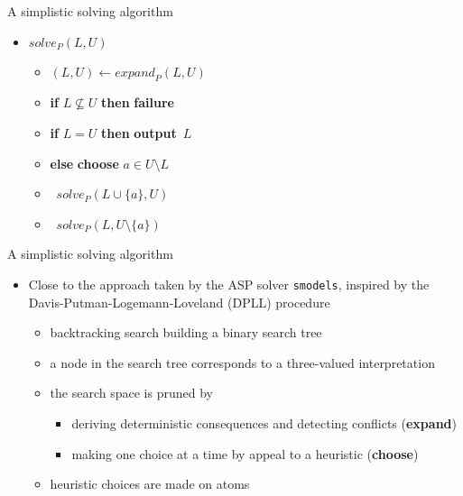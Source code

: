 \begin{frame}{A simplistic solving algorithm}
  \bigskip
  \begin{itemize}
  \item [] $\mathit{solve}_P(L,U)$
    \smallskip
    \begin{itemize}\normalsize
    \item [] $(L,U)\leftarrow\mathit{expand}_P(L,U)$                         \hfill{}
    \item [] \textbf{if} $L\not\subseteq U$ \textbf{then} \textbf{failure}   \hfill{}
    \item [] \textbf{if} $L =            U$ \textbf{then} \textbf{output}~$L$\hfill{}
    \item [] \textbf{else} \textbf{choose} $a\in U\setminus L$               \hfill{}
    \item [] \qquad\ $\mathit{solve}_P(L\cup\{a\},U              )$
    \item [] \qquad\ $\mathit{solve}_P(L,         U\setminus\{a\})$
    \end{itemize}
  \end{itemize}
\end{frame}
\begin{frame}{A simplistic solving algorithm}
\bigskip
\begin{itemize}
  \item Close to the approach taken by the ASP solver \texttt{smodels},
    inspired by the Davis-Putman-Logemann-Loveland (DPLL) procedure
    \smallskip
  \begin{itemize}\normalsize
  \item<2-> backtracking search building a binary search tree
  \item<2-> a node in the search tree corresponds to a three-valued interpretation
    \smallskip
  \item<3-> the search space is pruned by
    \begin{itemize}\normalsize
    \item deriving deterministic consequences and detecting conflicts (\textbf{expand})
    \item making one choice at a time by appeal to a heuristic (\textbf{choose})
    \end{itemize}
    \smallskip
  \item<4-> heuristic choices are made on atoms
  \end{itemize}
\end{itemize}
\end{frame}
%
